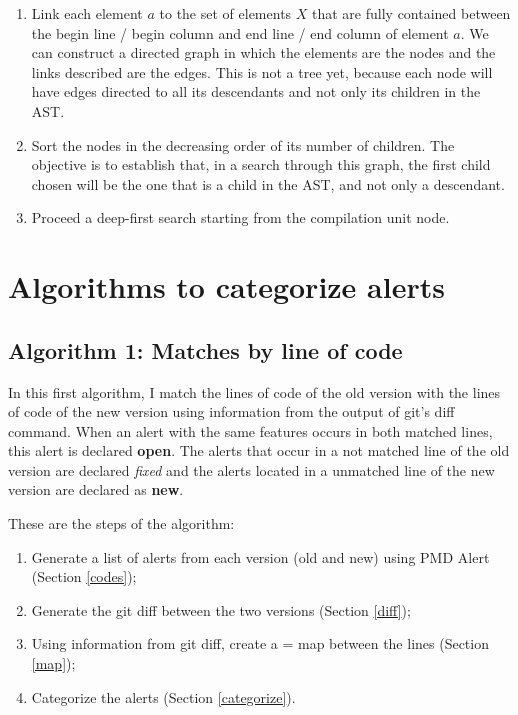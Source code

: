 \documentclass[
]{article}
\providecommand{\tightlist}{%
  \setlength{\itemsep}{0pt}\setlength{\parskip}{0pt}}
\begin{document}
\begin{enumerate}
\def\labelenumi{\arabic{enumi}.}
\item
  Link each element \(a\) to the set of elements \(X\) that are fully
  contained between the begin line / begin column and end line / end
  column of element \(a\). We can construct a directed graph in which
  the elements are the nodes and the links described are the edges. This
  is not a tree yet, because each node will have edges directed to all
  its descendants and not only its children in the AST.
\item
  Sort the nodes in the decreasing order of its number of children. The
  objective is to establish that, in a search through this graph, the
  first child chosen will be the one that is a child in the AST, and not
  only a descendant.
\item
  Proceed a deep-first search starting from the compilation unit node.
\end{enumerate}

\section{Algorithms to categorize alerts}\label{alg}

\subsection{Algorithm 1: Matches by line of code}\label{alg1}

In this first algorithm, I match the lines of code of the old version
with the lines of code of the new version using information from the
output of git's diff command. When an alert with the same features
occurs in both matched lines, this alert is declared \textbf{open}. The
alerts that occur in a not matched line of the old version are declared
\emph{fixed} and the alerts located in a unmatched line of the new
version are declared as \textbf{new}.

These are the steps of the algorithm:

\begin{enumerate}
\def\labelenumi{\arabic{enumi}.}
\tightlist
\item
  Generate a list of alerts from each version (old and new) using PMD
  Alert (Section \ref{codes});
\item
  Generate the git diff between the two versions (Section \ref{diff});
\item
  Using information from git diff, create a = map between the lines
  (Section \ref{map});
\item
  Categorize the alerts (Section \ref{categorize}).
\end{enumerate}
\end{document}

